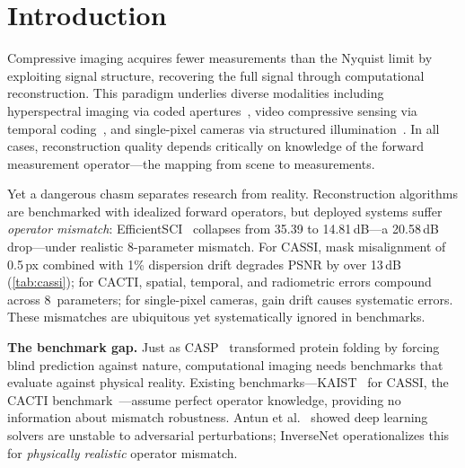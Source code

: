 \documentclass[runningheads]{llncs}
\begin{document}
\section{Introduction}
\label{sec:intro}

Compressive imaging acquires fewer measurements than the Nyquist limit by exploiting signal structure, recovering the full signal through computational reconstruction.
This paradigm underlies diverse modalities including hyperspectral imaging via coded apertures~\cite{wagadarikar2008cassi,meng2020e2e}, video compressive sensing via temporal coding~\cite{llull2013cacti,yuan2021snapshot}, and single-pixel cameras via structured illumination~\cite{duarte2008spc,edgar2019spc_review}.
In all cases, reconstruction quality depends critically on knowledge of the forward measurement operator---the mapping from scene to measurements.

Yet a dangerous chasm separates research from reality.
Reconstruction algorithms are benchmarked with idealized forward operators, but deployed systems suffer \emph{operator mismatch}: EfficientSCI~\cite{wang2023efficientsci} collapses from 35.39 to 14.81\,dB---a 20.58\,dB drop---under realistic 8-parameter mismatch.
For CASSI, mask misalignment of 0.5\,px combined with 1\% dispersion drift degrades PSNR by over 13\,dB (\cref{tab:cassi}); for CACTI, spatial, temporal, and radiometric errors compound across 8~parameters; for single-pixel cameras, gain drift causes systematic errors.
These mismatches are ubiquitous yet systematically ignored in benchmarks.

\textbf{The benchmark gap.}
Just as CASP~\cite{moult2005casp} transformed protein folding by forcing blind prediction against nature, computational imaging needs benchmarks that evaluate against physical reality.
Existing benchmarks---KAIST~\cite{choi2017kaist} for CASSI, the CACTI benchmark~\cite{yuan2021snapshot}---assume perfect operator knowledge, providing no information about mismatch robustness.
Antun et al.~\cite{antun2020instabilities} showed deep learning solvers are unstable to adversarial perturbations; InverseNet operationalizes this for \emph{physically realistic} operator mismatch.
\end{document}
